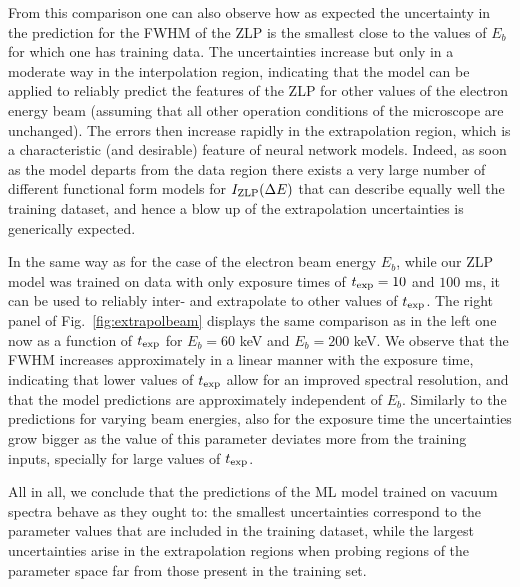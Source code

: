 From this comparison one can also observe how as expected the uncertainty in the  prediction for
the FWHM of the ZLP is the smallest close to the values of $E_b$ for which one has training data.
%
The uncertainties increase but only in a moderate way in the interpolation region, indicating that
the model can be applied to reliably predict the features of the ZLP for other values of the electron
energy beam (assuming that all other operation conditions of the microscope are unchanged).
%
The errors then increase rapidly in the extrapolation region, which is a characteristic
(and desirable) feature of  neural network models.
%
Indeed, as soon as the model departs from the data region there exists a very large
number of different functional form models for $I_{\rm ZLP}(\Delta E)$ that can describe equally well
the training dataset, and hence a blow up of the extrapolation uncertainties is generically expected.


In the same way as for the case of the electron beam energy $E_b$, while our ZLP model
was trained on data with only exposure times of $t_{\rm exp}=10$ and $100$ ms,
it can be used to reliably inter- and extrapolate to other values of $t_{\rm exp}$.
%
The right panel of Fig.~\ref{fig:extrapolbeam} displays the same
comparison as in the left one now as a function of $t_{\rm exp}$ for
$E_b=60$ keV and $E_b=200$ keV.
%
We observe that the FWHM increases approximately in a linear manner with the exposure time, indicating
that lower values of $t_{\rm exp}$ allow for an improved spectral resolution, and that the model
predictions are approximately independent of $E_b$.
%
Similarly to the predictions for varying beam energies, also for the exposure time the uncertainties grow bigger as the value of this parameter deviates more from the training inputs,
specially for large values of $t_{\rm exp}$.

All in all, we conclude that the predictions of the ML model trained on vacuum spectra
behave as they ought to: the smallest uncertainties correspond to the parameter values
that are included in the training dataset, while the largest uncertainties arise
in the extrapolation regions when probing regions of the parameter space far from those
present in the training set.


